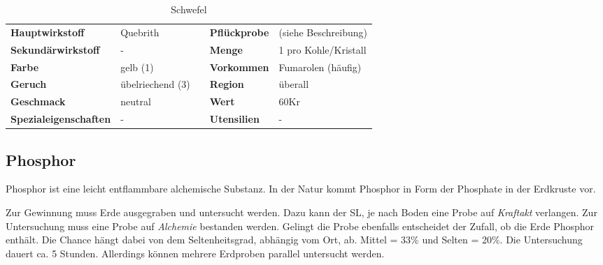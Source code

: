 \begin{table}[H] 
\begin{center} 
\begin{tabular}{|l|l|p{1cm}|l|l|} 
  	\cline{1-2} \cline{4-5} 
  	\textbf{Hauptwirkstoff} & Quebrith && \textbf{Pflückprobe} & (siehe Beschreibung) \\ \cline{1-2} \cline{4-5} 
  	\textbf{Sekundärwirkstoff} & - && \textbf{Menge} & 1 pro Kohle/Kristall \\ \cline{1-2} \cline{4-5} 
  	\textbf{Farbe} & gelb (1) && \textbf{Vorkommen} & Fumarolen (häufig) \\ \cline{1-2} \cline{4-5} 
  	\textbf{Geruch} & übelriechend (3) && \textbf{Region} & überall \\ \cline{1-2} \cline{4-5} 
  	\textbf{Geschmack} & neutral && \textbf{Wert} & 60Kr \\ \cline{1-2} \cline{4-5} 
  	\textbf{Spezialeigenschaften} & - && \textbf{Utensilien} & - \\ \cline{1-2} \cline{4-5} 
\end{tabular} 
\end{center} 
\caption{Schwefel} 
\label{tab:schwefel} 
\end{table}


\subsection{Phosphor}
Phosphor ist eine leicht entflammbare alchemische Substanz. In der Natur kommt Phosphor in Form der Phosphate in der Erdkruste vor. 

Zur Gewinnung muss Erde ausgegraben und untersucht werden. Dazu kann der SL, je nach Boden eine Probe auf \textit{Kraftakt} verlangen. Zur Untersuchung muss eine Probe auf \textit{Alchemie} bestanden werden. Gelingt die Probe ebenfalls entscheidet der Zufall, ob die Erde Phosphor enthält. Die Chance hängt dabei von dem Seltenheitsgrad, abhängig vom Ort, ab. Mittel = 33\% und Selten = 20\%. Die Untersuchung dauert ca. 5 Stunden. Allerdings können mehrere Erdproben parallel untersucht werden.

